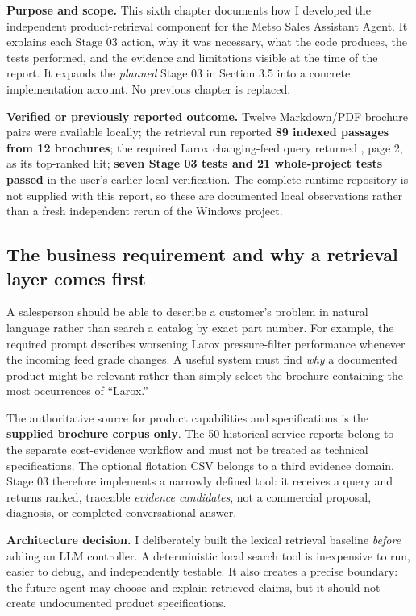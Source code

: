 \documentclass[11pt,a4paper]{article}
\DeclareRobustCommand{\code}[1]{{\ttfamily\small\detokenize{#1}}}
\begin{document}
\begin{keybox}
\textbf{Purpose and scope.} This sixth chapter documents how I developed the independent product-retrieval component for the Metso Sales Assistant Agent. It explains each Stage 03 action, why it was necessary, what the code produces, the tests performed, and the evidence and limitations visible at the time of the report. It expands the \emph{planned} Stage 03 in Section 3.5 into a concrete implementation account. No previous chapter is replaced.

\textbf{Verified or previously reported outcome.} Twelve Markdown/PDF brochure pairs were available locally; the retrieval run reported \textbf{89 indexed passages from 12 brochures}; the required Larox changing-feed query returned \code{filter-optimizer.md}, page 2, as its top-ranked hit; \textbf{seven Stage 03 tests and 21 whole-project tests passed} in the user's earlier local verification. The complete runtime repository is not supplied with this report, so these are documented local observations rather than a fresh independent rerun of the Windows project.
\end{keybox}

\subsection{The business requirement and why a retrieval layer comes first}
A salesperson should be able to describe a customer's problem in natural language rather than search a catalog by exact part number. For example, the required prompt describes worsening Larox pressure-filter performance whenever the incoming feed grade changes. A useful system must find \emph{why} a documented product might be relevant rather than simply select the brochure containing the most occurrences of ``Larox.''

The authoritative source for product capabilities and specifications is the \textbf{supplied brochure corpus only}. The 50 historical service reports belong to the separate cost-evidence workflow and must not be treated as technical specifications. The optional flotation CSV belongs to a third evidence domain. Stage 03 therefore implements a narrowly defined tool: it receives a query and returns ranked, traceable \emph{evidence candidates}, not a commercial proposal, diagnosis, or completed conversational answer.

\textbf{Architecture decision.} I deliberately built the lexical retrieval baseline \emph{before} adding an LLM controller. A deterministic local search tool is inexpensive to run, easier to debug, and independently testable. It also creates a precise boundary: the future agent may choose and explain retrieved claims, but it should not create undocumented product specifications.
\end{document}
